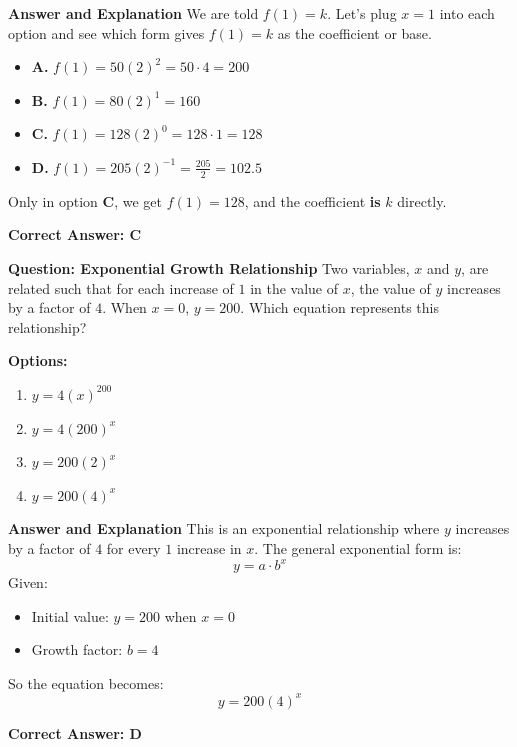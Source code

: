 \documentclass{beamer}
\begin{document}
\begin{frame}{\textbf{Answer and Explanation}}
We are told $f(1) = k$. Let's plug $x = 1$ into each option and see which form gives $f(1) = k$ as the coefficient or base.

\begin{itemize}
    \item \textbf{A.} $f(1) = 50(2)^2 = 50 \cdot 4 = 200$
    \item \textbf{B.} $f(1) = 80(2)^1 = 160$
    \item \textbf{C.} $f(1) = 128(2)^0 = 128 \cdot 1 = 128$
    \item \textbf{D.} $f(1) = 205(2)^{-1} = \frac{205}{2} = 102.5$
\end{itemize}

Only in option \textbf{C}, we get $f(1) = 128$, and the coefficient \textbf{is} $k$ directly.

\textbf{Correct Answer: C}
\end{frame}


\begin{frame}{\textbf{Question: Exponential Growth Relationship}}
Two variables, $x$ and $y$, are related such that for each increase of $1$ in the value of $x$, the value of $y$ increases by a factor of $4$. When $x = 0$, $y = 200$. Which equation represents this relationship?

\textbf{Options:}
\begin{enumerate}
    \item[A.] $y = 4(x)^{200}$
    \item[B.] $y = 4(200)^x$
    \item[C.] $y = 200(2)^x$
    \item[D.] $y = 200(4)^x$
\end{enumerate}
\end{frame}


\begin{frame}{\textbf{Answer and Explanation}}
This is an exponential relationship where $y$ increases by a factor of $4$ for every $1$ increase in $x$. The general exponential form is:
\[
y = a \cdot b^x
\]
Given:
\begin{itemize}
    \item Initial value: $y = 200$ when $x = 0$
    \item Growth factor: $b = 4$
\end{itemize}

So the equation becomes:
\[
y = 200(4)^x
\]

\textbf{Correct Answer: D}
\end{frame}
\end{document}
